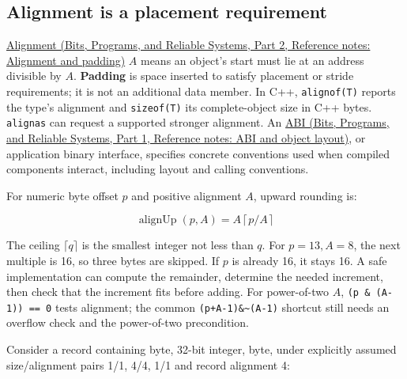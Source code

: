 \subsection{Alignment is a placement requirement}\label{05-engine-i-ch002-alignment-is-a-placement-requirement}

\hypertarget{05-engine-i-ch002-alignment-is-a-placement-requirement}{}

\href{../01-Bits-Programs-and-Reliable-Systems-P02/main.pdf\#nameddest=appendix-a1f7c53b4742}{Alignment (Bits, Programs, and Reliable Systems, Part 2, Reference notes: Alignment and padding)} \(A\) means an object's start must lie at an address divisible by \(A\). \textbf{Padding} is space inserted to satisfy placement or stride requirements; it is not an additional data member. In C++, \texttt{alignof(T)} reports the type's alignment and \texttt{sizeof(T)} its complete-object size in C++ bytes. \texttt{alignas} can request a supported stronger alignment. An \href{../01-Bits-Programs-and-Reliable-Systems-P01/main.pdf\#nameddest=appendix-c4ac6bb0fff8}{ABI (Bits, Programs, and Reliable Systems, Part 1, Reference notes: ABI and object layout)}, or application binary interface, specifies concrete conventions used when compiled components interact, including layout and calling conventions.

For numeric byte offset \(p\) and positive alignment \(A\), upward rounding is:

\[
\operatorname{alignUp}(p,A)=A\left\lceil p/A\right\rceil
\]

The ceiling \(\lceil q\rceil\) is the smallest integer not less than \(q\). For \(p=13,A=8\), the next multiple is 16, so three bytes are skipped. If \(p\) is already 16, it stays 16. A safe implementation can compute the remainder, determine the needed increment, then check that the increment fits before adding. For power-of-two \(A\), \texttt{(p\ \&\ (A-1))\ ==\ 0} tests alignment; the common \texttt{(p+A-1)\&\textasciitilde{}(A-1)} shortcut still needs an overflow check and the power-of-two precondition.

Consider a record containing byte, 32-bit integer, byte, under explicitly assumed size/alignment pairs 1/1, 4/4, 1/1 and record alignment 4:

